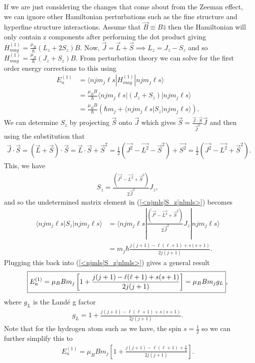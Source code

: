 \documentclass[11pt]{article}
\begin{document}
If we are just considering the changes that come about from the Zeeman effect, we can ignore other Hamiltonian perturbations such as the fine structure and hyperfine structure interactions. Assume that $\vec{B} \equiv B\hat{z}$ then the Hamiltonian will only contain z components after performing the dot product giving $H_{mag}^{(1)} = \frac{\mu_B}{\hbar}(L_z+2S_z)B$. Now, $\vec{J}=\vec{L}+\vec{S} \implies L_z = J_z-S_z$ and so
$H_{mag}^{(1)} = \frac{\mu_B}{\hbar}(J_z+S_z)B$. From perturbation theory we can solve for the first order energy corrections to this using
\begin{align}
E_{n}^{(1)} &= \langle n j m_j \ell s| H_{mag}^{(1)}|n j m_j \ell s \rangle \nonumber\\
&= \frac{\mu_BB}{\hbar}\langle n j m_j \ell s| (J_z+S_z)|n j m_j \ell s \rangle \nonumber\\
&= \frac{\mu_BB}{\hbar}\left(\hbar m_j+\langle n j m_j \ell s| S_z|n j m_j \ell s \rangle \right). \label{<njmls|S_z|nlmls>}
\end{align}
We can determine $S_z$ by projecting $\vec{S}$ onto $\vec{J}$ which gives $\vec{S} = \frac{\vec{J}\cdot\vec{S}}{\vec{J}^2}\vec{J}$ and then using the substitution that 
\begin{align}
\vec{J}\cdot \vec{S} = (\vec{L}+\vec{S})\cdot \vec{S} = \vec{L}\cdot\vec{S}+\vec{S}^2 = \frac{1}{2}(\vec{J^2}-\vec{L^2}-\vec{S}^2)+\vec{S^2} = \frac{1}{2}(\vec{J^2}-\vec{L^2}+\vec{S}^2).
\end{align}
This, we have
\begin{align}
S_z = \frac{(\vec{J^2}-\vec{L^2}+\vec{S}^2)}{2\vec{J}^2}J_z,
\end{align}
and so the undetermined matrix element in (\ref{<njmls|S_z|nlmls>}) becomes 
\begin{align}
\langle n j m_j \ell s| S_z|n j m_j \ell s \rangle &= \langle n j m_j \ell s| \frac{(\vec{J^2}-\vec{L^2}+\vec{S}^2)}{2\vec{J}^2}J_z|n j m_j \ell s \rangle \nonumber \\
&= m_j \hbar \frac{j(j+1)-\ell(\ell+1)+s(s+1)}{2j(j+1)}.
\end{align}
Plugging this back into (\ref{<njmls|S_z|nlmls>}) gives a general result
\begin{align}
\boxed{E_{n}^{(1)} = \mu_BBm_j\left[1+\frac{j(j+1)-\ell(\ell+1)+s(s+1)}{2j(j+1)}\right] = \mu_BBm_jg_L}, \label{E_{n}^{(1)}}
\end{align}
where $g_L$ is the Land\'{e} g factor
\begin{align}
g_L = 1+\frac{j(j+1)-\ell(\ell+1)+s(s+1)}{2j(j+1)}.
\end{align}
Note that for the hydrogen atom such as we have, the spin $s=\frac{1}{2}$ so we can further simplify this to 
\begin{align}
E_{n}^{(1)} = \mu_BBm_j\left[1+\frac{j(j+1)-\ell(\ell+1)+\frac{3}{4} }{2j(j+1)} \right].
\end{align}
\end{document}
